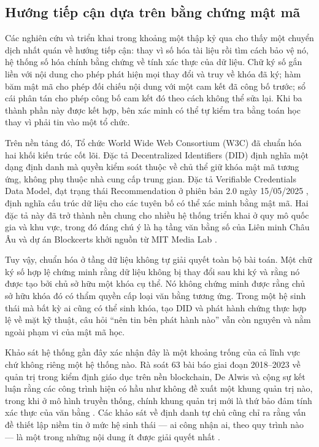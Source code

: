 \subsection{Hướng tiếp cận dựa trên bằng chứng mật mã}

Các nghiên cứu và triển khai trong khoảng một thập kỷ qua cho thấy một chuyển dịch nhất quán về hướng tiếp cận: thay vì số hóa tài liệu rồi tìm cách bảo vệ nó, hệ thống số hóa chính bằng chứng về tính xác thực của dữ liệu. Chữ ký số gắn liền với nội dung cho phép phát hiện mọi thay đổi và truy về khóa đã ký; hàm băm mật mã cho phép đối chiếu nội dung với một cam kết đã công bố trước; sổ cái phân tán cho phép công bố cam kết đó theo cách không thể sửa lại. Khi ba thành phần này được kết hợp, bên xác minh có thể tự kiểm tra bằng toán học thay vì phải tin vào một tổ chức.

Trên nền tảng đó, Tổ chức World Wide Web Consortium (W3C) đã chuẩn hóa hai khối kiến trúc cốt lõi. Đặc tả Decentralized Identifiers (DID) \cite{W3C_DIDCore2022} định nghĩa một dạng định danh mà quyền kiểm soát thuộc về chủ thể giữ khóa mật mã tương ứng, không phụ thuộc nhà cung cấp trung gian. Đặc tả Verifiable Credentials Data Model, đạt trạng thái Recommendation ở phiên bản 2.0 ngày 15/05/2025 \cite{W3C_VCDM2025}, định nghĩa cấu trúc dữ liệu cho các tuyên bố có thể xác minh bằng mật mã. Hai đặc tả này đã trở thành nền chung cho nhiều hệ thống triển khai ở quy mô quốc gia và khu vực, trong đó đáng chú ý là hạ tầng văn bằng số của Liên minh Châu Âu \cite{EDC_ELM} và dự án Blockcerts khởi nguồn từ MIT Media Lab \cite{Blockcerts2016}.

Tuy vậy, chuẩn hóa ở tầng dữ liệu không tự giải quyết toàn bộ bài toán. Một chữ ký số hợp lệ chứng minh rằng dữ liệu không bị thay đổi sau khi ký và rằng nó được tạo bởi chủ sở hữu một khóa cụ thể. Nó không chứng minh được rằng chủ sở hữu khóa đó có thẩm quyền cấp loại văn bằng tương ứng. Trong một hệ sinh thái mà bất kỳ ai cũng có thể sinh khóa, tạo DID và phát hành chứng thực hợp lệ về mặt kỹ thuật, câu hỏi {``}nên tin bên phát hành nào{''} vẫn còn nguyên và nằm ngoài phạm vi của mật mã học.

Khảo sát hệ thống gần đây xác nhận đây là một khoảng trống của cả lĩnh vực chứ không riêng một hệ thống nào. Rà soát 63 bài báo giai đoạn 2018--2023 về quản trị trong kiểm định giáo dục trên nền blockchain, De Alwis và cộng sự kết luận rằng các công trình hiện có hầu như không đề xuất một khung quản trị nào, trong khi ở mô hình truyền thống, chính khung quản trị mới là thứ bảo đảm tính xác thực của văn bằng \cite{DeAlwis2025}. Các khảo sát về định danh tự chủ cũng chỉ ra rằng vấn đề thiết lập niềm tin ở mức hệ sinh thái --- ai công nhận ai, theo quy trình nào --- là một trong những nội dung ít được giải quyết nhất \cite{Schardong2022, Sedlmeir2021}.

